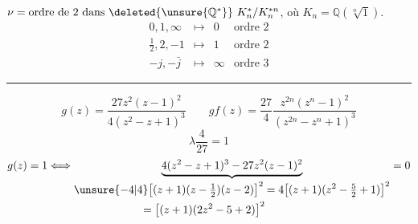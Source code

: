 $\nu=\text{ordre de }2\text{ dans }\deleted{\unsure{\mathbb Q^*}}\ K_n^*/K_n^{*n}$, où $K_n=\mathbb Q(\sqrt[n]{1})$.
\[
\begin{array}{rcll}
0,1,\infty&\longmapsto&0&\text{ordre }2\\
\tfrac12,2,-1&\longmapsto&1&\text{ordre }2\\
-j,-\bar j&\longmapsto&\infty&\text{ordre }3
\end{array}
\]
\par\noindent\rule{.7\linewidth}{.2pt}
\[
g(z)=\frac{27z^2(z-1)^2}{4(z^2-z+1)^3}\qquad
 gf(z)=\frac{27}{4}\frac{z^{2n}(z^n-1)^2}{(z^{2n}-z^n+1)^3}
\]
\[\lambda\frac4{27}=1\]
\[
g(z)=1\Longleftrightarrow
\underbrace{4(z^2-z+1)^3-27z^2(z-1)^2}_{\begin{aligned}
&\unsure{-4|4}\bigl[(z+1)(z-\tfrac12)(z-2)\bigr]^2
=4\bigl[(z+1)(z^2-\tfrac52+1)\bigr]^2\\
&\hspace{6em}=\bigl[(z+1)(2z^2-5+2)\bigr]^2
\end{aligned}}=0
\]
